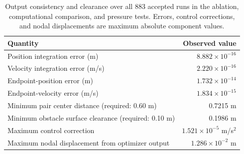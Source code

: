 \begin{table}[htbp]
\caption{Output consistency and clearance over all 883 accepted runs in the ablation, computational comparison, and pressure tests. Errors, control corrections, and nodal displacements are maximum absolute component values.\label{tab:verification}}
\small\begin{tabularx}{\textwidth}{Yr}
\toprule Quantity & Observed value \\
\midrule
Position integration error (m) & $8.882\times10^{-16}$ \\
Velocity integration error (m/s) & $2.220\times10^{-16}$ \\
Endpoint-position error (m) & $1.732\times10^{-14}$ \\
Endpoint-velocity error (m/s) & $1.834\times10^{-15}$ \\
Minimum pair center distance (required: 0.60 m) & 0.7215 m \\
Minimum obstacle surface clearance (required: 0.10 m) & 0.1986 m \\
Maximum control correction & $1.521\times10^{-5}$ m/s$^2$ \\
Maximum nodal displacement from optimizer output & $1.286\times10^{-2}$ m \\
\bottomrule\end{tabularx}
\end{table}
